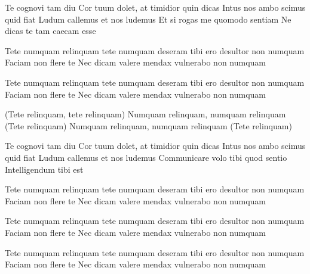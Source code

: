 Te cognovi tam diu
Cor tuum dolet, at timidior quin dicas
Intus nos ambo scimus quid fiat
Ludum callemus et nos ludemus
Et si rogas me quomodo sentiam
Ne dicas te tam caecam esse
 
Tete numquam relinquam
tete numquam deseram
tibi ero desultor non numquam
Faciam non flere te
Nec dicam valere
mendax vulnerabo non numquam

Tete numquam relinquam
tete numquam deseram
tibi ero desultor non numquam
Faciam non flere te
Nec dicam valere
mendax vulnerabo non numquam
 
(Tete relinquam, tete relinquam)
Numquam relinquam, numquam relinquam
(Tete relinquam)
Numquam relinquam, numquam relinquam
(Tete relinquam)
 
Te cognovi tam diu
Cor tuum dolet, at timidior quin dicas
Intus nos ambo scimus quid fiat
Ludum callemus et nos ludemus
Communicare volo tibi quod sentio
Intelligendum tibi est

Tete numquam relinquam
tete numquam deseram
tibi ero desultor non numquam
Faciam non flere te
Nec dicam valere
mendax vulnerabo non numquam

Tete numquam relinquam
tete numquam deseram
tibi ero desultor non numquam
Faciam non flere te
Nec dicam valere
mendax vulnerabo non numquam

Tete numquam relinquam
tete numquam deseram
tibi ero desultor non numquam
Faciam non flere te
Nec dicam valere
mendax vulnerabo non numquam
